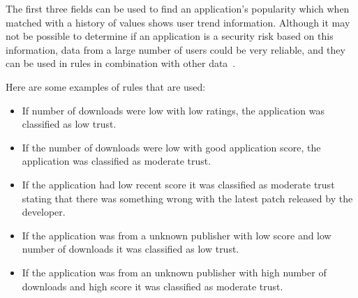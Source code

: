 The first three fields can be used to find an application’s
popularity which when matched with a history of values shows
user trend information.  Although it may not be possible to determine if an
application is a security risk based on this
information, data from a large number of users could be very reliable, and 
they can be used in rules in combination with other data~\cite{jing2014riskmon}.

Here are some examples of rules that are used: 
\begin{itemize}
  \item If number of downloads were low with low ratings, the
    application was classified as low trust.
  \item If the number of downloads were low with good application
    score, the application was classified as moderate trust.
  \item If the application had low recent score it was classified as moderate trust
    stating that there was something wrong with the latest patch released by the developer.
  \item If the application was from a unknown publisher with low score
    and low number of downloads it was classified as low trust.
  \item If the application was from an unknown publisher with high
    number of downloads and high score it was classified as moderate trust.
\end{itemize}
